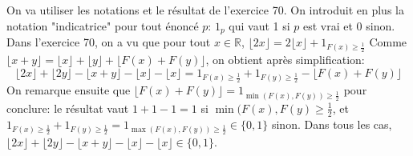 On va utiliser les notations et le résultat de l'exercice 70. On introduit en plus la notation "indicatrice" pour tout énoncé $p$: $1_{p}$ qui vaut 1 si $p$ est vrai et 0 sinon. 
Dans l'exercice 70, on a vu que pour tout $x \in \mathbb{R}$,
 $\lfloor 2x \rfloor = 2\lfloor x \rfloor + 1_{F(x)\geq \frac{1}{2}}$
Comme $\lfloor x+y \rfloor = \lfloor x \rfloor  + \lfloor y \rfloor + \lfloor F(x)+F(y) \rfloor$, on obtient après simplification:
\[
\lfloor 2x \rfloor + \lfloor 2y \rfloor  - \lfloor x+y \rfloor  - \lfloor x \rfloor  - \lfloor x \rfloor = 1_{F(x)\geq \frac{1}{2}} + 1_{F(y)\geq \frac{1}{2}} - \lfloor F(x)+F(y) \rfloor 
\]
On remarque ensuite que $\lfloor F(x)+F(y) \rfloor = 1_{\min(F(x),F(y))\geq \frac{1}{2}}$ pour conclure: le résultat vaut $1+1-1=1$ si $\min(F(x), F(y)\geq \frac{1}{2}$, et $1_{F(x)\geq \frac{1}{2}} + 1_{F(y)\geq \frac{1}{2}} = 1_{\max(F(x), F(y))\geq \frac{1}{2}} \in \{0,1\}$ sinon. Dans tous les cas, $\lfloor 2x \rfloor + \lfloor 2y \rfloor  - \lfloor x+y \rfloor  - \lfloor x \rfloor  - \lfloor x \rfloor \in \{0,1\}$.
